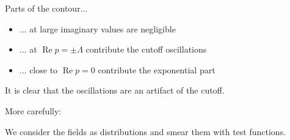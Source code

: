 \documentclass[aspectratio=169]{beamer}
\renewcommand\Re{\operatorname{Re}}
\begin{document}
\begin{frame}
Parts of the contour...

\pause
\begin{itemize}
\item \alert<1>{... at large imaginary values are negligible}


\pause
\item \alert<2>{... at $\Re p = \pm \Lambda$ contribute the cutoff oscillations}


\pause
\item \alert<3>{... close to $\Re p = 0$ contribute the exponential part}


\end{itemize}
\end{frame}


\begin{frame}
It is clear that the oscillations are an \alert{artifact of the cutoff}.

\bigskip
\pause
More carefully:

\pause
\medskip
We consider the fields as \alert{distributions} and \alert{smear} them with test functions.
\end{frame}
\end{document}
